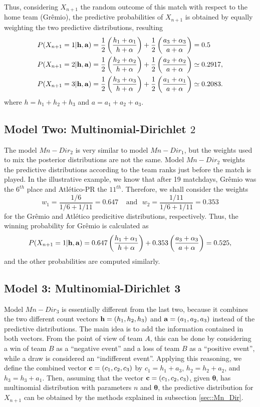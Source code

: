 \documentclass[journal,article,accept,moreauthors,pdftex,12pt,a4paper]{mdpi}
\begin{document}
Thus, considering $X_{n + 1}$ the random outcome of this match with
respect to the home team (Gr\^{e}mio), the predictive probabilities
of $X_{n + 1}$ is obtained by equally weighting the two predictive
distributions, resulting
\begin{align*}
P(X_{n+1}=1|{\bf h}, {\bf a}) &=
\frac{1}{2}\left(\frac{h_1+\alpha_1}{h+\alpha}\right)+\frac{1}{2}\left(\frac{a_3+\alpha_3}{a+\alpha}\right)=0.5
\\
P(X_{n+1}=2|{\bf h}, {\bf a}) &=
\frac{1}{2}\left(\frac{h_2+\alpha_2}{h+\alpha}\right)+\frac{1}{2}\left(\frac{a_2+\alpha_2}{a+\alpha}\right)\simeq0.2917, \\
P(X_{n+1}=3|{\bf h}, {\bf a}) &= \frac{1}{2}
\left(\frac{h_3+\alpha_3}{h+\alpha}\right)+\frac{1}{2}\left(\frac{a_1+\alpha_1}{a+\alpha}\right)\simeq0.2083.
\end{align*}
\noindent where $h=h_1+h_2+h_3$ and $a=a_1+a_2+a_3$.

\subsection{Model Two: Multinomial-Dirichlet $2$}
\label{sec::Mn_Dir2}

The model $Mn-Dir_2$ is very similar to model $Mn-Dir_1$, but the
weights used to mix the posterior distributions are not the same.
Model $Mn-Dir_2$ weights the predictive distributions according to
the team ranks just before the match is played. In the illustrative
example, we know that after 19 matchdays, Gr\^emio was the $6^{th}$
place and Atl\'etico-PR the $11^{th}$. Therefore, we shall consider
the weights
\[w_1 = \frac{1/6}{1/6+1/11}=0.647 ~ ~ ~ ~ ~\text{and} ~ ~ ~ w_2 = \frac{1/11}{1/6+1/11}=0.353\]
\noindent for the Gr\^emio and Atl\'etico predicitive distributions,
respectively. Thus, the winning probability for Gr\^emio is
calculated as
\[P(X_{n+1}= 1|{\bf h}, {\bf a})=0.647\left(\frac{h_1+\alpha_1}{h+\alpha}\right)+0.353\left(\frac{a_3+\alpha_3}{a+\alpha}\right)=0.525,\]
\noindent and the other probabilities are computed similarly.

\subsection{Model 3: Multinomial-Dirichlet 3}
\label{sec::Mn_Dir3}

Model $Mn-Dir_3$ is essentially different from the
last two, because it combines the two different count vectors ${\bf
h} = (h_1, h_2, h_3)$ and ${\bf a} = (a_1, a_2, a_3)$ instead of the
predictive distributions. The main idea is to add the information
contained in both vectors. From the point of view of team $A$, this can
be done by considering a win of team $B$ as a ``negative event'' and a
loss of team $B$ as a ``positive event'', while a draw is
considered an ``indifferent event''. Applying this reasoning,
we define the combined vector ${\bf c} = (c_1, c_2, c_3)$ by $c_1 =
h_1 + a_3$, $h_2 = h_2 + a_2$, and $h_3 = h_3 + a_1$. Then, assuming that the vector ${\bf c} = (c_1, c_2, c_3)$, given $\boldsymbol{\theta}$, has multinomial distribution with parameters $n$ and
$\boldsymbol{\theta}$, the predictive distribution for $X_{n + 1}$ can
be obtained by the methods explained in subsection
\ref{sec::Mn_Dir}.
\end{document}
